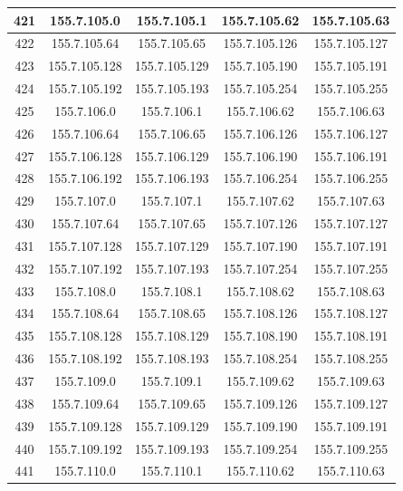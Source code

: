 \documentclass[letterpaper,12pt]{article}
\begin{document}
\begin{longtable}{|c|c|c|c|c|}
        421 & 155.7.105.0 & 155.7.105.1 & 155.7.105.62 & 155.7.105.63 \\ \hline
        422 & 155.7.105.64 & 155.7.105.65 & 155.7.105.126 & 155.7.105.127 \\ \hline
        423 & 155.7.105.128 & 155.7.105.129 & 155.7.105.190 & 155.7.105.191 \\ \hline
        424 & 155.7.105.192 & 155.7.105.193 & 155.7.105.254 & 155.7.105.255 \\ \hline
        425 & 155.7.106.0 & 155.7.106.1 & 155.7.106.62 & 155.7.106.63 \\ \hline
        426 & 155.7.106.64 & 155.7.106.65 & 155.7.106.126 & 155.7.106.127 \\ \hline
        427 & 155.7.106.128 & 155.7.106.129 & 155.7.106.190 & 155.7.106.191 \\ \hline
        428 & 155.7.106.192 & 155.7.106.193 & 155.7.106.254 & 155.7.106.255 \\ \hline
        429 & 155.7.107.0 & 155.7.107.1 & 155.7.107.62 & 155.7.107.63 \\ \hline
        430 & 155.7.107.64 & 155.7.107.65 & 155.7.107.126 & 155.7.107.127 \\ \hline
        431 & 155.7.107.128 & 155.7.107.129 & 155.7.107.190 & 155.7.107.191 \\ \hline
        432 & 155.7.107.192 & 155.7.107.193 & 155.7.107.254 & 155.7.107.255 \\ \hline
        433 & 155.7.108.0 & 155.7.108.1 & 155.7.108.62 & 155.7.108.63 \\ \hline
        434 & 155.7.108.64 & 155.7.108.65 & 155.7.108.126 & 155.7.108.127 \\ \hline
        435 & 155.7.108.128 & 155.7.108.129 & 155.7.108.190 & 155.7.108.191 \\ \hline
        436 & 155.7.108.192 & 155.7.108.193 & 155.7.108.254 & 155.7.108.255 \\ \hline
        437 & 155.7.109.0 & 155.7.109.1 & 155.7.109.62 & 155.7.109.63 \\ \hline
        438 & 155.7.109.64 & 155.7.109.65 & 155.7.109.126 & 155.7.109.127 \\ \hline
        439 & 155.7.109.128 & 155.7.109.129 & 155.7.109.190 & 155.7.109.191 \\ \hline
        440 & 155.7.109.192 & 155.7.109.193 & 155.7.109.254 & 155.7.109.255 \\ \hline
        441 & 155.7.110.0 & 155.7.110.1 & 155.7.110.62 & 155.7.110.63 \\ \hline

\end{longtable}
\end{document}
